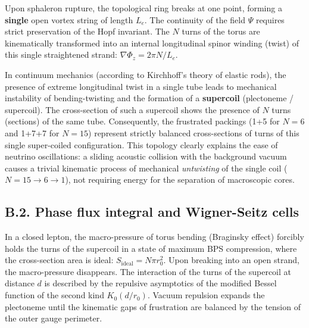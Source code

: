 \documentclass[11pt,a4paper]{article}
\begin{document}
Upon sphaleron rupture, the topological ring breaks at one point, forming a \textbf{single} open vortex string of length $L_e$. The continuity of the field $\Psi$ requires strict preservation of the Hopf invariant. The $N$ turns of the torus are kinematically transformed into an internal longitudinal spinor winding (twist) of this single straightened strand: $\nabla \Phi_z = 2\pi N / L_e$.

In continuum mechanics (according to Kirchhoff's theory of elastic rods), the presence of extreme longitudinal twist in a single tube leads to mechanical instability of bending-twisting and the formation of a \textbf{supercoil} (plectoneme / supercoil). The cross-section of such a supercoil shows the presence of $N$ turns (sections) of the same tube. Consequently, the frustrated packings (1+5 for $N=6$ and 1+7+7 for $N=15$) represent strictly balanced cross-sections of turns of this single super-coiled configuration. This topology clearly explains the ease of neutrino oscillations: a sliding acoustic collision with the background vacuum causes a trivial kinematic process of mechanical \textit{untwisting} of the single coil ($N=15 \to 6 \to 1$), not requiring energy for the separation of macroscopic cores.

\subsection*{B.2. Phase flux integral and Wigner-Seitz cells}
In a closed lepton, the macro-pressure of torus bending (Braginsky effect) forcibly holds the turns of the supercoil in a state of maximum BPS compression, where the cross-section area is ideal: $S_{\text{ideal}} = N \pi r_0^2$.
Upon breaking into an open strand, the macro-pressure disappears. The interaction of the turns of the supercoil at distance $d$ is described by the repulsive asymptotics of the modified Bessel function of the second kind $K_0(d/r_0)$. Vacuum repulsion expands the plectoneme until the kinematic gaps of frustration are balanced by the tension of the outer gauge perimeter.
\end{document}
